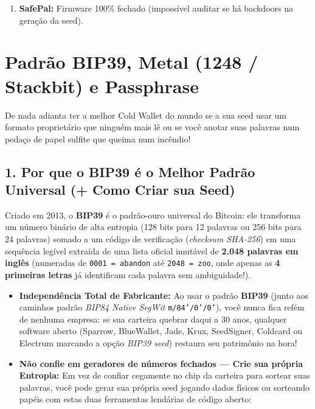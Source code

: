 \documentclass{pousadaguide}
\begin{document}
\begin{perigo}
\begin{itemize}
\begin{enumerate}
    \item \textbf{SafePal:} Firmware 100\% fechado (impossível auditar se há backdoors na geração da seed).
  \end{enumerate}
\end{itemize}
\end{perigo}

\section{Padrão BIP39, Metal (1248 / Stackbit) e Passphrase}

De nada adianta ter a melhor Cold Wallet do mundo se a sua seed usar um formato proprietário que ninguém mais lê ou se você anotar suas palavras num pedaço de papel sulfite que queima num incêndio!

\subsection{1. Por que o BIP39 é o Melhor Padrão Universal (+ Como Criar sua Seed)}
Criado em 2013, o \textbf{BIP39} é o padrão-ouro universal do Bitcoin: ele transforma um número binário de alta entropia (128 bits para 12 palavras ou 256 bits para 24 palavras) somado a um código de verificação (\emph{checksum SHA-256}) em uma sequência legível extraída de uma lista oficial imutável de \textbf{2.048 palavras em inglês} (numeradas de \texttt{0001 = abandon} até \texttt{2048 = zoo}, onde apenas as \textbf{4 primeiras letras} já identificam cada palavra sem ambiguidade!).
\begin{itemize}
  \item \textbf{Independência Total de Fabricante:} Ao usar o padrão \textbf{BIP39} (junto aos caminhos padrão \emph{BIP84 Native SegWit} \texttt{m/84'/0'/0'}), você nunca fica refém de nenhuma empresa: se sua carteira quebrar daqui a 30 anos, qualquer software aberto (Sparrow, BlueWallet, Jade, Krux, SeedSigner, Coldcard ou Electrum marcando a opção \emph{BIP39 seed}) restaura seu patrimônio na hora!
  \item \textbf{Não confie em geradores de números fechados — Crie sua própria Entropia:} Em vez de confiar cegamente no chip da carteira para sortear suas palavras, você pode gerar sua própria seed jogando dados físicos ou sorteando papéis com estas duas ferramentas lendárias de código aberto:
\end{itemize}
\end{document}
